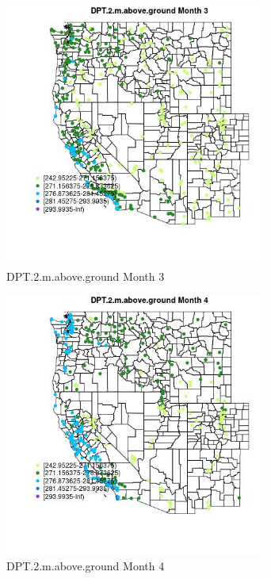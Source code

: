 \begin{figure} 
\centering  
\includegraphics[width=0.77\textwidth]{Code_Outputs/Report_ML_input_PM25_Step4_part_e_de_duplicated_aves_compiled_2019-05-18wNAs_MapObsMo3DPT2maboveground.jpg} 
\caption{\label{fig:Report_ML_input_PM25_Step4_part_e_de_duplicated_aves_compiled_2019-05-18wNAsMapObsMo3DPT2maboveground}DPT.2.m.above.ground Month 3} 
\end{figure} 
 

\clearpage 

\begin{figure} 
\centering  
\includegraphics[width=0.77\textwidth]{Code_Outputs/Report_ML_input_PM25_Step4_part_e_de_duplicated_aves_compiled_2019-05-18wNAs_MapObsMo4DPT2maboveground.jpg} 
\caption{\label{fig:Report_ML_input_PM25_Step4_part_e_de_duplicated_aves_compiled_2019-05-18wNAsMapObsMo4DPT2maboveground}DPT.2.m.above.ground Month 4} 
\end{figure} 
 


